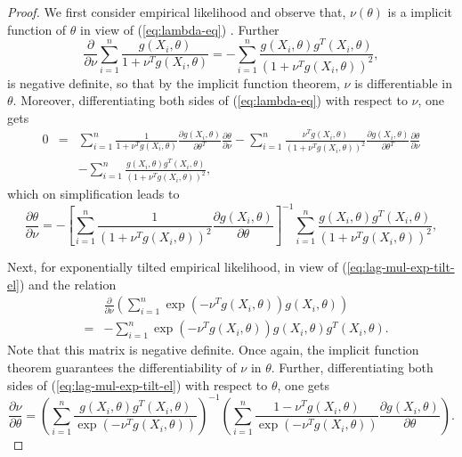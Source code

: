 \documentclass[oneside,english]{amsbook}
\numberwithin{section}{chapter}
\numberwithin{equation}{section}
\numberwithin{figure}{section}
\theoremstyle{plain}
\theoremstyle{plain}
\theoremstyle{definition}
\theoremstyle{plain}
\theoremstyle{plain}
\theoremstyle{remark}
\theoremstyle{definition}
\theoremstyle{definition}
\begin{document}
\begin{proof}
We first consider empirical likelihood and observe that, $\nu\left(\theta\right)$
is a implicit function of $\theta$ in view of (\ref{eq:lambda-eq})
. Further 
\[
\frac{\partial}{\partial\nu}\sum_{i=1}^{n}\frac{g\left(X_{i},\theta\right)}{1+\nu^{T}g\left(X_{i},\theta\right)}=-\sum_{i=1}^{n}\frac{g\left(X_{i},\theta\right)g^{T}\left(X_{i},\theta\right)}{\left(1+\nu^{T}g\left(X_{i},\theta\right)\right)^{2}},
\]
is negative definite, so that by the implicit function theorem, $\nu$
is differentiable in $\theta$. Moreover, differentiating both sides
of (\ref{eq:lambda-eq}) with respect to $\nu$, one gets
\begin{eqnarray*}
0 & = & \sum_{i=1}^{n}\frac{1}{1+\nu^{T}g\left(X_{i},\theta\right)}\frac{\partial g\left(X_{i},\theta\right)}{\partial\theta^{T}}\frac{\partial\theta}{\partial\nu}-\sum_{i=1}^{n}\frac{\nu^{T}g\left(X_{i},\theta\right)}{\left(1+\nu^{T}g\left(X_{i},\theta\right)\right)^{2}}\frac{\partial g\left(X_{i},\theta\right)}{\partial\theta^{T}}\frac{\partial\theta}{\partial\nu}\\
 &  & -\sum_{i=1}^{n}\frac{g\left(X_{i},\theta\right)g^{T}\left(X_{i},\theta\right)}{\left(1+\nu^{T}g\left(X_{i},\theta\right)\right)^{2}},
\end{eqnarray*}
which on simplification leads to 
\begin{equation}
\frac{\partial\theta}{\partial\nu}=-\left[\sum_{i=1}^{n}\frac{1}{\left(1+\nu^{T}g\left(X_{i},\theta\right)\right)^{2}}\frac{\partial g\left(X_{i},\theta\right)}{\partial\theta}\right]^{-1}\sum_{i=1}^{n}\frac{g\left(X_{i},\theta\right)g^{T}\left(X_{i},\theta\right)}{\left(1+\nu^{T}g\left(X_{i},\theta\right)\right)^{2}},\label{eq:decreasing-theta-to-nu}
\end{equation}


Next, for exponentially tilted empirical likelihood, in view of (\ref{eq:lag-mul-exp-tilt-el})
and the relation 
\begin{eqnarray*}
 &  & \frac{\partial}{\partial\nu}\left(\sum_{i=1}^{n}\exp\left(-\nu^{T}g\left(X_{i},\theta\right)\right)g\left(X_{i},\theta\right)\right)\\
 & = & -\sum_{i=1}^{n}\exp\left(-\nu^{T}g\left(X_{i},\theta\right)\right)g\left(X_{i},\theta\right)g^{T}\left(X_{i},\theta\right).
\end{eqnarray*}
Note that this matrix is negative definite. Once again, the implicit
function theorem guarantees the differentiability of $\nu$ in $\theta$.
Further, differentiating both sides of (\ref{eq:lag-mul-exp-tilt-el})
with respect to $\theta$, one gets 
\begin{equation}
\frac{\partial\nu}{\partial\theta}=\left(\sum_{i=1}^{n}\frac{g\left(X_{i},\theta\right)g^{T}\left(X_{i},\theta\right)}{\exp\left(-\nu^{T}g\left(X_{i},\theta\right)\right)}\right)^{-1}\left(\sum_{i=1}^{n}\frac{1-\nu^{T}g\left(X_{i},\theta\right)}{\exp\left(-\nu^{T}g\left(X_{i},\theta\right)\right)}\frac{\partial g\left(X_{i},\theta\right)}{\partial\theta}\right).\label{eq:first-deri-lag-mult-exp-tilted-el}
\end{equation}



\end{proof}
\end{document}
